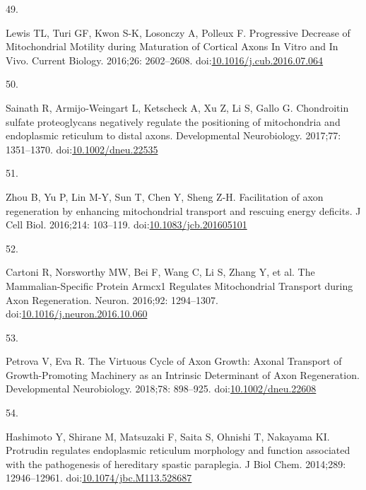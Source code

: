 \documentclass[
  12pt,
  a4paper,
]{book}
\newlength{\cslhangindent}
\newlength{\csllabelwidth}
\newlength{\cslentryspacingunit} %
\newenvironment{CSLReferences}[2] %
 {%
  \setlength{\parindent}{0pt}
  \ifodd #1
  \let\oldpar\par
  \def\par{\hangindent=\cslhangindent\oldpar}
  \fi
  \setlength{\parskip}{#2\cslentryspacingunit}
 }%
 {}
\newcommand{\CSLLeftMargin}[1]{\parbox[t]{\csllabelwidth}{#1}}
\newcommand{\CSLRightInline}[1]{\parbox[t]{\linewidth - \csllabelwidth}{#1}\break}
\begin{document}
\begin{CSLReferences}{0}{0}
\leavevmode{}%
\CSLLeftMargin{49. }%
\CSLRightInline{Lewis TL, Turi GF, Kwon S-K, Losonczy A, Polleux F. Progressive {Decrease} of {Mitochondrial Motility} during {Maturation} of {Cortical Axons In Vitro} and {In Vivo}. Current Biology. 2016;26: 2602--2608. doi:\href{https://doi.org/10.1016/j.cub.2016.07.064}{10.1016/j.cub.2016.07.064}}

\leavevmode{}%
\CSLLeftMargin{50. }%
\CSLRightInline{Sainath R, Armijo‐Weingart L, Ketscheck A, Xu Z, Li S, Gallo G. Chondroitin sulfate proteoglycans negatively regulate the positioning of mitochondria and endoplasmic reticulum to distal axons. Developmental Neurobiology. 2017;77: 1351--1370. doi:\href{https://doi.org/10.1002/dneu.22535}{10.1002/dneu.22535}}

\leavevmode{}%
\CSLLeftMargin{51. }%
\CSLRightInline{Zhou B, Yu P, Lin M-Y, Sun T, Chen Y, Sheng Z-H. Facilitation of axon regeneration by enhancing mitochondrial transport and rescuing energy deficits. J Cell Biol. 2016;214: 103--119. doi:\href{https://doi.org/10.1083/jcb.201605101}{10.1083/jcb.201605101}}

\leavevmode{}%
\CSLLeftMargin{52. }%
\CSLRightInline{Cartoni R, Norsworthy MW, Bei F, Wang C, Li S, Zhang Y, et al. The {Mammalian-Specific Protein Armcx1 Regulates Mitochondrial Transport} during {Axon Regeneration}. Neuron. 2016;92: 1294--1307. doi:\href{https://doi.org/10.1016/j.neuron.2016.10.060}{10.1016/j.neuron.2016.10.060}}

\leavevmode{}%
\CSLLeftMargin{53. }%
\CSLRightInline{Petrova V, Eva R. The {Virtuous Cycle} of {Axon Growth}: {Axonal Transport} of {Growth-Promoting Machinery} as an {Intrinsic Determinant} of {Axon Regeneration}. Developmental Neurobiology. 2018;78: 898--925. doi:\href{https://doi.org/10.1002/dneu.22608}{10.1002/dneu.22608}}

\leavevmode{}%
\CSLLeftMargin{54. }%
\CSLRightInline{Hashimoto Y, Shirane M, Matsuzaki F, Saita S, Ohnishi T, Nakayama KI. Protrudin regulates endoplasmic reticulum morphology and function associated with the pathogenesis of hereditary spastic paraplegia. J Biol Chem. 2014;289: 12946--12961. doi:\href{https://doi.org/10.1074/jbc.M113.528687}{10.1074/jbc.M113.528687}}


\end{CSLReferences}
\end{document}
